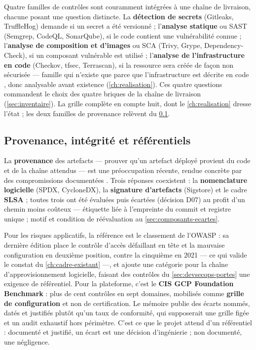 Quatre familles de contrôles sont couramment intégrées à une chaîne de livraison, chacune posant
une question distincte. La \textbf{détection de secrets} (Gitleaks, TruffleHog) demande si un
secret a été versionné \cite{gitguardian_sprawl} ; l'\textbf{analyse statique} ou SAST (Semgrep,
CodeQL, SonarQube), si le code contient une vulnérabilité connue ; l'\textbf{analyse de
composition et d'images} ou SCA (Trivy, Grype, Dependency-Check), si un composant vulnérable est
utilisé ; l'\textbf{analyse de l'infrastructure en code} (Checkov, tfsec, Terrascan), si la
ressource sera créée de façon non sécurisée --- famille qui n'existe que parce que
l'infrastructure est décrite en code \cite{iac_morris2020}, donc analysable avant existence
(\cref{ch:realisation}). Ces quatre questions commandent le choix des quatre briques de la chaîne
de livraison (\cref{sec:inventaire}). La grille complète en compte huit, dont le
\cref{ch:realisation} dresse l'état ; les deux familles de provenance relèvent du
\cref{sec:provenance-artefacts}.

\subsection{Provenance, intégrité et référentiels}
\label{sec:provenance-artefacts}
\label{sec:referentiels}

La \textbf{provenance} des artefacts --- prouver qu'un artefact déployé provient du code et de la
chaîne attendus --- est une préoccupation récente, rendue concrète par des compromissions
documentées \cite{cisa_aa20_352a}. Trois réponses coexistent : la \textbf{nomenclature logicielle}
(SPDX, CycloneDX), la \textbf{signature d'artefacts} (Sigstore) et le cadre \textbf{SLSA}
\cite{slsa_framework} ; toutes trois ont été évaluées puis écartées (décision D07) au profit d'un
chemin moins coûteux --- étiquette liée à l'empreinte du commit et registre unique ; motif et
condition de réévaluation au \cref{sec:composants-ecartes}.

Pour les risques applicatifs, la référence est le classement de l'OWASP \cite{owasp2025} : sa
dernière édition place le contrôle d'accès défaillant en tête et la mauvaise configuration en
deuxième position, contre la cinquième en 2021 --- ce qui valide le constat du
\cref{ch:cadre-existant} ---, et ajoute une catégorie pour la chaîne d'approvisionnement
logicielle, faisant des contrôles du \cref{sec:devsecops-portes} une exigence de référentiel.
Pour la plateforme, c'est le \textbf{CIS GCP Foundation Benchmark}
\cite{cis_gcp_benchmark,gcp_container_best_practices} : plus de cent contrôles en sept domaines,
mobilisés comme \textbf{grille de configuration} et non de certification. Le mémoire publie des
écarts nommés, datés et justifiés plutôt qu'un taux de conformité, qui supposerait une grille
figée et un audit exhaustif hors périmètre. C'est ce que le projet attend d'un référentiel :
documenté et justifié, un écart est une décision d'ingénierie ; non documenté, une négligence.

